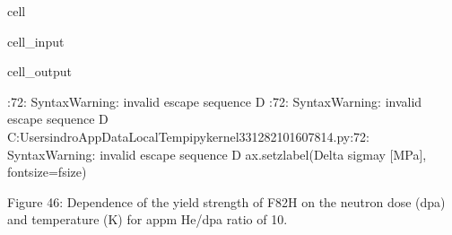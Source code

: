 \documentclass[letterpaper,10pt,english]{jupyterBook}
\begin{document}
\begin{sphinxuseclass}{cell}
\begin{sphinxVerbatimInput}
\begin{sphinxuseclass}{cell_input}
		\end{sphinxuseclass}\end{sphinxVerbatimInput}
		\begin{sphinxVerbatimOutput}
			
			\begin{sphinxuseclass}{cell_output}
				\begin{sphinxVerbatim}[commandchars=\\\{\}]
					\PYGZlt{}\PYGZgt{}:72: SyntaxWarning: invalid escape sequence \PYGZsq{}\PYGZbs{}D\PYGZsq{}
					\PYGZlt{}\PYGZgt{}:72: SyntaxWarning: invalid escape sequence \PYGZsq{}\PYGZbs{}D\PYGZsq{}
					C:\PYGZbs{}Users\PYGZbs{}indro\PYGZbs{}AppData\PYGZbs{}Local\PYGZbs{}Temp\PYGZbs{}ipykernel\PYGZus{}33128\PYGZbs{}2101607814.py:72: SyntaxWarning: invalid escape sequence \PYGZsq{}\PYGZbs{}D\PYGZsq{}
					ax.set\PYGZus{}zlabel(\PYGZsq{}\PYGZdl{}\PYGZbs{}Delta \PYGZbs{}sigma\PYGZus{}y\PYGZdl{} [MPa]\PYGZsq{}, fontsize=f\PYGZus{}size)
				\end{sphinxVerbatim}
				
				\noindent{}
				
		\end{sphinxuseclass}\end{sphinxVerbatimOutput}
		
	\end{sphinxuseclass}
	\sphinxAtStartPar
	Figure 46: Dependence of the yield strength of F82H on the neutron dose (dpa) and temperature (K) for appm He/dpa ratio of 10.
	
	
\end{document}
